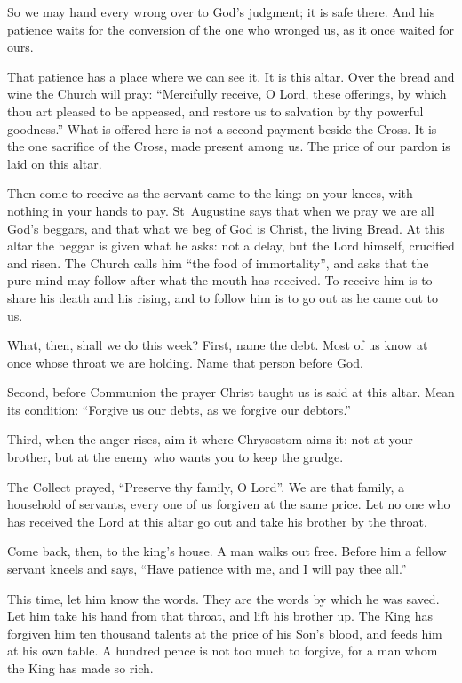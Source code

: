So we may hand every wrong over to God's judgment; it is safe there. And his
patience waits for the conversion of the one who wronged us, as it once waited
for ours.

\medskip

That patience has a place where we can see it. It is this altar. Over the
bread and wine the Church will pray: ``Mercifully receive, O Lord, these offerings, by which thou art pleased
to be appeased, and restore us to salvation by thy powerful goodness.'' What is
offered here is not a second payment beside the Cross. It is the one sacrifice
of the Cross, made present among us. The price of our pardon is laid on this
altar.

Then come to receive as the servant came to the king: on your knees, with
nothing in your hands to pay. St~Augustine says that when we pray we are
all God's beggars, and that what we beg of God is Christ, the living Bread. At
this altar the beggar is given what he asks: not a delay, but the Lord himself,
crucified and risen. The Church calls him ``the food of immortality'', and asks
that the pure mind may follow after what the mouth has received. To receive
him is to share his death and his rising, and to follow him is to go
out as he came out to us.

\medskip

What, then, shall we do this week? First, name the debt. Most of us know at once whose throat we are holding. Name
that person before God.

Second, before Communion the prayer Christ taught us is said at this altar.
Mean its condition: ``Forgive us our debts, as we forgive our debtors.''

Third, when the anger rises, aim it where Chrysostom aims it: not at your
brother, but at the enemy who wants you to keep the grudge.

The Collect prayed, ``Preserve thy family, O Lord''. We are that family, a
household of servants, every one of us forgiven at the same price. Let no one who has received the Lord at this altar
go out and take his brother by the throat.

\medskip

Come back, then, to the king's house. A man walks out free. Before him a fellow
servant kneels and says, ``Have patience with me, and I will pay thee all.''

This time, let him know the words. They are the words by which he was saved.
Let him take his hand from that throat, and lift his brother up. The King has
forgiven him ten thousand talents at the price of his Son's blood, and feeds him
at his own table. A hundred pence is not too much to forgive, for a man whom
the King has made so rich.
